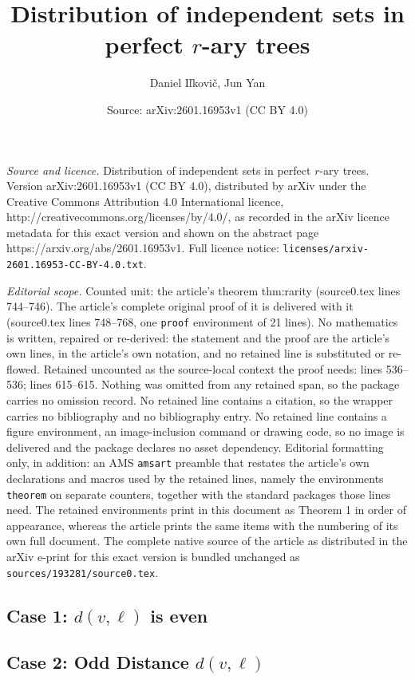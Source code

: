 \documentclass[10pt,a4paper]{amsart}
\title{Distribution of independent sets in perfect $r$-ary trees}
\author{Daniel I\v{l}kovi\v{c}, Jun Yan}
\date{Source: arXiv:2601.16953v1 (CC BY 4.0)}
\begin{document}
\maketitle

\noindent\emph{Source and licence.} Distribution of independent sets in perfect $r$-ary trees. Version arXiv:2601.16953v1 (CC BY 4.0), distributed by arXiv under the Creative Commons Attribution 4.0 International licence, http://creativecommons.org/licenses/by/4.0/, as recorded in the arXiv licence metadata for this exact version and shown on the abstract page https://arxiv.org/abs/2601.16953v1. Full licence notice: \texttt{licenses/arxiv-2601.16953-CC-BY-4.0.txt}.\par\smallskip

\noindent\textit{Editorial scope.} Counted unit: the article's theorem thm:rarity (source0.tex lines 744--746). The article's complete original proof of it is delivered with it (source0.tex lines 748--768, one \texttt{proof} environment of 21 lines). No mathematics is written, repaired or re-derived: the statement and the proof are the article's own lines, in the article's own notation, and no retained line is substituted or re-flowed.  Retained uncounted as the source-local context the proof needs: lines 536--536; lines 615--615.  Nothing was omitted from any retained span, so the package carries no omission record.  No retained line contains a citation, so the wrapper carries no bibliography and no bibliography entry.  No retained line contains a figure environment, an image-inclusion command or drawing code, so no image is delivered and the package declares no asset dependency.  Editorial formatting only, in addition: an AMS \texttt{amsart} preamble that restates the article's own declarations and macros used by the retained lines, namely the environments \texttt{theorem} on separate counters, together with the standard packages those lines need.  The retained environments print in this document as Theorem 1 in order of appearance, whereas the article prints the same items with the numbering of its own full document.  The complete native source of the article as distributed in the arXiv e-print for this exact version is bundled unchanged as \texttt{sources/193281/source0.tex}.
\subsection{Case 1: $d(v,\ell)$ is even}\label{sec:even}

\subsection{Case 2: Odd Distance $d(v,\ell)$}\label{sec:odd}
\end{document}
